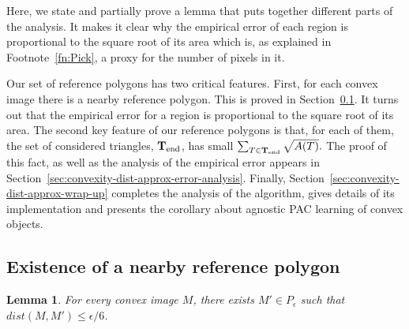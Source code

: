 \documentclass[11pt,english]{article}
\newtheorem{lemma}[theorem]{Lemma}
\numberwithin{figure}{section}
\newcommand{\dis}{dist}
\newcommand{\Tend}{{\bf T}_{\text{end}}}
\newcommand{\mydelta}{\epsilon} \newcommand{\bigdelta}{{\epsilon_0}} \newcommand{\dsquares}{d_{\rm squares}}
\begin{document}
Here, we state and partially prove a lemma that puts together different parts of the analysis. It makes it clear why the empirical error of each region is proportional to the square root of its area which is, as explained in Footnote~\ref{fn:Pick}, a proxy for the number of pixels in it.


\else
Our set of reference polygons has two critical features. First, for each convex image there is a nearby reference polygon. This is proved in Section~\ref{sec:existence-of-nearby-ref-poly}. It turns out that the empirical error for a region is proportional to the square root of its area. The second key feature of our reference polygons is that, for each of them, the set of considered triangles, $\Tend$, has small $\sum_{T\in\Tend} \sqrt{A(T)}.$ The proof of this fact, as well as the analysis of the empirical error appears in Section~\ref{sec:convexity-dist-approx-error-analysis}. Finally, Section~\ref{sec:convexity-dist-approx-wrap-up} completes the analysis of the algorithm, gives details of its implementation and presents the corollary about agnostic PAC learning of convex objects.

\subsection{Existence of a nearby reference polygon}\label{sec:existence-of-nearby-ref-poly}
\begin{lemma}\label{lem:nearby-reference-polygon}
 For every convex image $M$, there exists $M'\in P_\mydelta$ such that $\dis(M,M')\leq\mydelta/6$.
\end{lemma}
\end{document}
